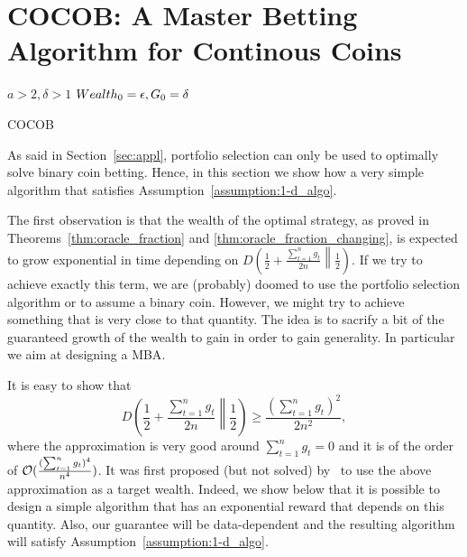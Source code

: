 \section{COCOB: A Master Betting Algorithm for Continous Coins}
\label{sec:algo}

\begin{algorithm}[ht]
  \begin{algorithmic}
  {
     $a>2,\delta>1$
     $Wealth_0=\epsilon,G_0=\delta$
    \ENDFOR
  }
  \end{algorithmic}
  \caption{COCOB}
  \label{alg:cocob}
\end{algorithm}

As said in Section~\ref{sec:appl}, portfolio selection can only be used to optimally solve binary coin betting.
Hence, in this section we show how a very simple algorithm that satisfies Assumption~\ref{assumption:1-d_algo}.

The first observation is that the wealth of the optimal strategy, as proved in Theorems~\ref{thm:oracle_fraction} and \ref{thm:oracle_fraction_changing}, is expected to grow exponential in time depending on $D\left(\frac{1}{2}+\frac{\sum_{t=1}^n g_t}{2 n}\middle\|\frac{1}{2}\right)$. If we try to achieve exactly this term, we are (probably) doomed to use the portfolio selection algorithm or to assume a binary coin.
However, we might try to achieve something that is very close to that quantity.
The idea is to sacrify a bit of the guaranteed growth of the wealth to gain in order to gain generality. In particular we aim at designing a \ac{MBA}.

It is easy to show that
\[
D\left(\frac{1}{2}+\frac{\sum_{t=1}^n g_t}{2 n}\middle\|\frac{1}{2}\right) \geq \frac{(\sum_{t=1}^n g_t)^2}{2 n^2},
\]
where the approximation is very good around $\sum_{t=1}^n g_t=0$ and it is of the order of $\mathcal{O}(\frac{(\sum_{t=1}^n g_t)^4}{ n^4})$. It was first proposed (but not solved) by~\cite{McMahanA13} to use the above approximation as a target wealth.
Indeed, we show below that it is possible to design a simple algorithm that has an exponential reward that depends on this quantity. Also, our guarantee will be data-dependent and the resulting algorithm will satisfy Assumption~\ref{assumption:1-d_algo}.

